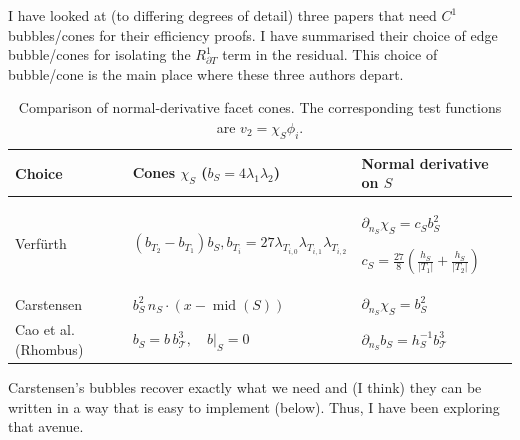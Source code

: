 \documentclass[12pt,a4paper]{article}
\begin{document}
I have looked at (to differing degrees of detail) three papers that need $C^1$ bubbles/cones for their efficiency proofs. I have summarised their choice of edge bubble/cones for isolating the $R_{\partial T}^1$ term in the residual. This choice of bubble/cone is the main place where these three authors depart. 

\begin{table}[ht]
\centering
\small
\renewcommand{\arraystretch}{2}

\begin{tabular}{|l|p{}|p{}|}
\hline
\textbf{Choice} &
\textbf{Cones $\chi_S$ ($b_S = 4 \lambda_1 \lambda_2$)} &
\textbf{Normal derivative on $S$} \\
\hline


Verf\"urth &
$\displaystyle
(b_{T_2}-b_{T_1})b_S, b_{T_i} = 27 \lambda_{T_{i, 0}} \lambda_{T_{i, 1}} \lambda_{T_{i, 2}}
$ &
$\displaystyle
\partial_{n_S}\chi_S=c_S b_S^2
$

$\displaystyle
c_S=\frac{27}{8}
\left(\frac{h_S}{|T_1|}+
\frac{h_S}{|T_2|}\right)
$ \\
\hline

Carstensen &
$\displaystyle
b_S^2\,
n_S\cdot(x-\operatorname{mid}(S)) $&
$\displaystyle
\partial_{n_S}\chi_S=b_S^2
$ \\
\hline

Cao et al. (Rhombus) &
$\displaystyle
b_S=b\,b_{\mathcal T}^{3},
\quad b|_S=0 
$ &
$\displaystyle
\partial_{n_S}b_S
=h_S^{-1}b_{\mathcal T}^{3} 
$ \\
\hline


\end{tabular}

\caption{Comparison of normal-derivative facet cones.
The corresponding test functions are $v_2 =\chi_S\phi_i$.}
\end{table}

Carstensen's bubbles recover exactly what we need and (I think) they can be written in a way that is easy to implement (below). Thus, I have been exploring that avenue. 

\newpage 
\end{document}
